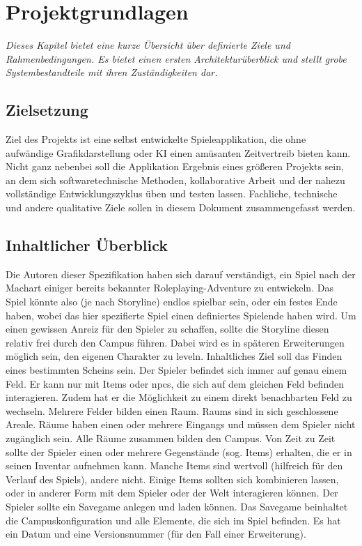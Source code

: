 \chapter{Projektgrundlagen}

\textit{Dieses Kapitel bietet eine kurze Übersicht über definierte Ziele und Rahmenbedingungen. Es bietet
einen ersten Architekturüberblick und stellt grobe Systembestandteile mit ihren Zuständigkeiten dar.}

\section{Zielsetzung}
Ziel des Projekts ist eine selbst entwickelte Spieleapplikation, die ohne
aufwändige Grafikdarstellung oder KI einen amüsanten Zeitvertreib bieten
kann. Nicht ganz nebenbei soll die Applikation Ergebnis eines größeren
Projekts sein, an dem sich softwaretechnische Methoden, kollaborative Arbeit
und der nahezu vollständige Entwicklungszyklus üben und testen lassen.
Fachliche, technische und andere qualitative Ziele sollen in diesem Dokument
zusammengefasst werden.

\section{Inhaltlicher Überblick}
Die Autoren dieser Spezifikation haben sich darauf verständigt, ein Spiel nach der Machart einiger
bereits bekannter Roleplaying-Adventure zu entwickeln. Das Spiel könnte also (je nach Storyline) endlos 
spielbar sein, oder ein festes Ende haben, wobei das hier spezifierte Spiel einen definiertes Spielende
haben wird.
Um einen gewissen Anreiz für den \gls{Spieler} zu schaffen, sollte die Storyline 
diesen relativ frei durch den \gls{Campus} führen. Dabei wird es in späteren Erweiterungen
möglich sein, den eigenen \gls{Charakter} zu leveln. Inhaltliches Ziel soll das Finden
eines bestimmten \gls{Schein}s sein.
Der Spieler befindet sich immer auf genau einem \gls{Feld}. Er kann nur mit \glspl{Item} oder \gls{npcs}, die
sich auf dem gleichen \gls{Feld} befinden interagieren. Zudem hat er die Möglichkeit zu einem direkt 
benachbarten \gls{Feld} zu wechseln. Mehrere Felder bilden einen \gls{Raum}. \glspl{Raum} sind in sich 
geschlossene Areale. Räume haben einen oder mehrere \glspl{Eingang} und müssen dem \gls{Spieler} nicht 
zugänglich sein. Alle Räume zusammen bilden den \gls{Campus}. 
Von Zeit zu Zeit sollte der \gls{Spieler} einen oder mehrere Gegenstände (sog. \glspl{Item}) erhalten, die er
in seinen \gls{Inventar} aufnehmen kann. Manche \glspl{Item} sind wertvoll (hilfreich für den Verlauf des 
Spiels), andere nicht. Einige \glspl{Item} sollten sich kombinieren lassen, oder in anderer Form mit 
dem \gls{Spieler} oder der \gls{Welt} interagieren können. Der \gls{Spieler} sollte ein \gls{Savegame} 
anlegen und laden können. Das \gls{Savegame} beinhaltet die Campuskonfiguration und alle Elemente, die sich im
Spiel befinden. Es hat ein Datum und eine Versionsnummer (für den Fall einer Erweiterung).

